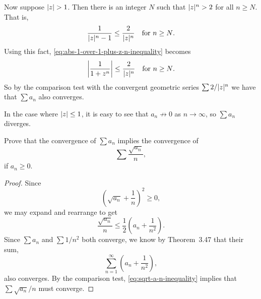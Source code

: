 \begin{enumerate}
\begin{solution}
    Now suppose $\lvert{z}\rvert > 1$. Then there is an integer $N$ such that
    $\lvert{z}\rvert^n > 2$ for all $n\geq N$. That is,
    \begin{equation*}
      \frac1{\lvert{z}\rvert^n - 1}\leq \frac2{\lvert{z}\rvert^n}
      \quad\text{for $n\geq N$}.
    \end{equation*}
    Using this fact, \eqref{eq:abs-1-over-1-plus-z-n-inequality}
    becomes
    \begin{equation*}
      \left\lvert{\frac1{1 + z^n}}\right\rvert \leq \frac2{\lvert{z}\rvert^n}
      \quad
      \text{for $n\geq N$}.
    \end{equation*}
    So by the comparison test with the convergent geometric series
    $\sum 2/\lvert{z}\rvert^n$ we have that $\sum a_n$ also converges.

    In the case where $\lvert{z}\rvert \leq 1$, it is easy to see that
    $a_n\not\to 0$ as $n\to\infty$, so $\sum a_n$ diverges.
  \end{solution}
\end{enumerate}

 Prove that the convergence of $\sum a_n$ implies the
convergence of
\begin{equation*}
  \sum\frac{\sqrt{a_n}}n,
\end{equation*}
if $a_n\geq0$.
\begin{proof}
  Since
  \begin{equation*}
    \left(\sqrt{a_n} + \frac1n\right)^2 \geq 0,
  \end{equation*}
  we may expand and rearrange to get
  \begin{equation}
    \label{eq:sqrt-a-n-inequality}
    \frac{\sqrt{a_n}}n \leq \frac12\left(a_n + \frac1{n^2}\right).
  \end{equation}
  Since $\sum a_n$ and $\sum1/n^2$ both converge, we know by
  Theorem~3.47 that their sum,
  \begin{equation*}
    \sum_{n=1}^\infty\left(a_n + \frac1{n^2}\right),
  \end{equation*}
  also converges. By the comparison test,
  \eqref{eq:sqrt-a-n-inequality} implies that $\sum\sqrt{a_n}/n$ must
  converge.
\end{proof}

